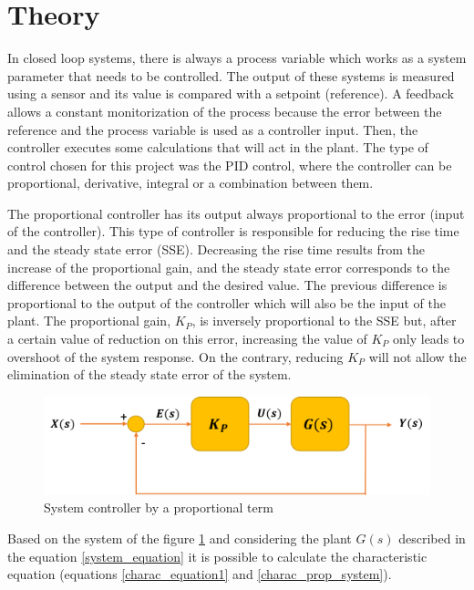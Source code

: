 \section{Theory}\label{sec:pid_theory}

In closed loop systems, there is always a process variable which works as a system parameter that needs to be controlled. The output of these systems is measured using a sensor and its value is compared with a setpoint (reference). A feedback allows a constant monitorization of the process because the error between the reference and the process variable is used as a controller input. Then, the controller executes some calculations that will act in the plant. The type of control chosen for this project was the PID control, where the controller can be proportional, derivative, integral or a combination between them. %

The proportional controller has its output always proportional to the error (input of the controller). This type of controller is responsible for reducing the rise time and the steady state error (SSE). Decreasing the rise time results from the increase of the proportional gain, and the steady state error corresponds to the difference between the output and the desired value. The previous difference is proportional to the output of the controller which will also be the input of the plant. The proportional gain, $K_P$, is inversely proportional to the SSE but, after a certain value of reduction on this error, increasing the value of $K_P$ only leads to overshoot of the system response. On the contrary, reducing $K_P$ will not allow the elimination of the steady state error of the system. 

\begin{figure}[H]
	\centering
	\includegraphics[scale=0.6]{figures/propor_controller.png}
	\caption{System controller by a proportional term}
	\label{propor_controller}
\end{figure}

Based on the system of the figure \ref{propor_controller} and considering the plant $G(s)$ described in the equation \ref{system_equation} it is possible to calculate the characteristic equation (equations \ref{charac_equation1} and \ref{charac_prop_system}).


